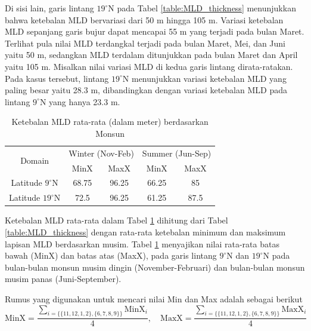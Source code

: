 \begin{spacing}{1.5}
		Di sisi lain, garis lintang $19^\circ$N pada Tabel \ref{table:MLD_thickness} menunjukkan bahwa ketebalan MLD bervariasi dari 50 m hingga 105 m. Variasi ketebalan MLD sepanjang garis bujur dapat mencapai 55 m yang terjadi pada bulan Maret. Terlihat pula nilai MLD terdangkal terjadi pada bulan Maret, Mei, dan Juni yaitu 50 m, sedangkan MLD terdalam ditunjukkan pada bulan Maret dan April yaitu 105 m. Misalkan nilai variasi MLD di kedua garis lintang dirata-ratakan. Pada kasus tersebut, lintang $19^\circ$N menunjukkan variasi ketebalan MLD yang paling besar yaitu 28.3 m, dibandingkan dengan variasi ketebalan MLD pada lintang $9^\circ$N yang hanya 23.3 m. 
		
		\begin{table}[H]
			\centering
			\caption{Ketebalan MLD rata-rata (dalam meter) berdasarkan Monsun}
			\label{table:MLD_monsoon}
			\begin{tabular}{|c|cc|cc|}
				\hline
				\multirow{2}{*}{Domain} & \multicolumn{2}{c|}{Winter (Nov-Feb)} & \multicolumn{2}{c|}{Summer (Jun-Sep)} \\ \cline{2-5} 
				& \multicolumn{1}{c|}{MinX}   & MaxX  & \multicolumn{1}{c|}{MinX}   & MaxX  \\ \hline
				Latitude $9^\circ$N             & \multicolumn{1}{c|}{68.75}   & 96.25  & \multicolumn{1}{c|}{66.25}   & 85     \\ \hline
				Latitude $19^\circ$N            & \multicolumn{1}{c|}{72.5}    & 96.25  & \multicolumn{1}{c|}{61.25}   & 87.5   \\ \hline
			\end{tabular}
		\end{table}

		Ketebalan MLD rata-rata dalam Tabel \ref{table:MLD_monsoon} dihitung dari Tabel \ref{table:MLD_thickness} dengan rata-rata ketebalan minimum dan maksimum lapisan MLD berdasarkan musim. Tabel \ref{table:MLD_monsoon} menyajikan nilai rata-rata batas bawah (MinX) dan batas atas (MaxX), pada garis lintang $9^\circ$N dan $19^\circ$N pada bulan-bulan monsun musim dingin (November-Februari) dan bulan-bulan monsun musim panas (Juni-September).
		
		Rumus yang digunakan untuk mencari nilai Min dan Max adalah sebagai berikut
		\begin{equation*}
			\text{MinX}=\frac{\sum_{i=\{\{11,12,1,2\},\{6,7,8,9\}\}}\text{MinX}_i}{4}, \quad
			\text{MaxX}=\frac{\sum_{i=\{\{11,12,1,2\},\{6,7,8,9\}\}}\text{MaxX}_i}{4}
		\end{equation*}
	

\end{spacing}
